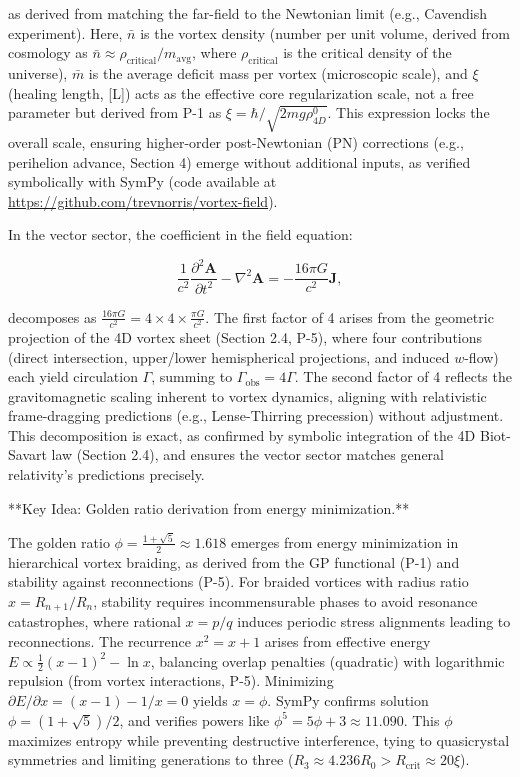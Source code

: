 
as derived from matching the far-field to the Newtonian limit (e.g., Cavendish experiment). Here, $\bar{n}$ is the vortex density (number per unit volume, derived from cosmology as $\bar{n} \approx \rho_{\text{critical}} / m_{\text{avg}}$, where $\rho_{\text{critical}}$ is the critical density of the universe), $\bar{m}$ is the average deficit mass per vortex (microscopic scale), and $\xi$ (healing length, [L]) acts as the effective core regularization scale, not a free parameter but derived from P-1 as $\xi = \hbar / \sqrt{2 m g \rho_{4D}^0}$. This expression locks the overall scale, ensuring higher-order post-Newtonian (PN) corrections (e.g., perihelion advance, Section 4) emerge without additional inputs, as verified symbolically with SymPy (code available at \url{https://github.com/trevnorris/vortex-field}).

In the vector sector, the coefficient in the field equation:

\[
\frac{1}{c^2} \frac{\partial^2 \mathbf{A}}{\partial t^2} - \nabla^2 \mathbf{A} = -\frac{16\pi G}{c^2} \mathbf{J},
\]

decomposes as $\frac{16\pi G}{c^2} = 4 \times 4 \times \frac{\pi G}{c^2}$. The first factor of 4 arises from the geometric projection of the 4D vortex sheet (Section 2.4, P-5), where four contributions (direct intersection, upper/lower hemispherical projections, and induced $w$-flow) each yield circulation $\Gamma$, summing to $\Gamma_{\text{obs}} = 4\Gamma$. The second factor of 4 reflects the gravitomagnetic scaling inherent to vortex dynamics, aligning with relativistic frame-dragging predictions (e.g., Lense-Thirring precession) without adjustment. This decomposition is exact, as confirmed by symbolic integration of the 4D Biot-Savart law (Section 2.4), and ensures the vector sector matches general relativity's predictions precisely.


**Key Idea: Golden ratio derivation from energy minimization.**

The golden ratio $\phi = \frac{1 + \sqrt{5}}{2} \approx 1.618$ emerges from energy minimization in hierarchical vortex braiding, as derived from the GP functional (P-1) and stability against reconnections (P-5). For braided vortices with radius ratio $x = R_{n+1}/R_n$, stability requires incommensurable phases to avoid resonance catastrophes, where rational $x = p/q$ induces periodic stress alignments leading to reconnections. The recurrence $x^2 = x + 1$ arises from effective energy $E \propto \frac{1}{2} (x - 1)^2 - \ln x$, balancing overlap penalties (quadratic) with logarithmic repulsion (from vortex interactions, P-5). Minimizing $\partial E / \partial x = (x - 1) - 1/x = 0$ yields $x = \phi$. SymPy confirms solution $\phi = (1 + \sqrt{5})/2$, and verifies powers like $\phi^5 = 5\phi + 3 \approx 11.090$. This $\phi$ maximizes entropy while preventing destructive interference, tying to quasicrystal symmetries and limiting generations to three ($R_3 \approx 4.236 R_0 > R_{\text{crit}} \approx 20 \xi$).

